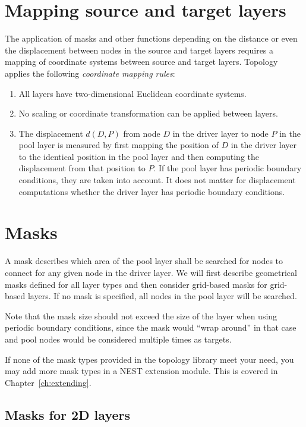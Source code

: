 \documentclass[a4paper,12pt]{report}
\begin{document}
\section{Mapping source and target layers}\label{sec:mapping}

The application of masks and other functions depending on the distance
or even the displacement between nodes in the source and target layers
requires a mapping of coordinate
systems between source and target
layers. Topology applies the following \emph{coordinate mapping
  rules}:
\begin{enumerate}
\item All layers have two-dimensional Euclidean coordinate systems.
\item No scaling or coordinate transformation can be applied between
  layers.
\item The displacement $d(D,P)$ from node $D$ in the driver layer to node $P$
  in the pool layer is measured by first mapping the position of $D$
  in the driver layer to the identical position in the pool layer and
  then computing the displacement from that position to $P$. If the
  pool layer has periodic boundary conditions, they are taken into
  account. It does not matter for displacement computations whether
  the driver layer has periodic boundary conditions.
\end{enumerate}


\section{Masks}\label{sec:conn_masks}

A mask describes which area of the pool layer shall be searched for
nodes to connect for any given node in the driver layer. We will first
describe geometrical masks defined for all layer types and then
consider grid-based masks for grid-based layers. If no mask is
specified, all nodes in the pool layer will be searched.

Note that the mask size should not exceed the size of the layer when
using periodic boundary conditions, since the mask would ``wrap
around'' in that case and pool nodes would be considered multiple
times as targets.

If none of the mask types provided in the topology library meet your need,
you may add more mask types in a NEST extension module. This is covered in
Chapter~\ref{ch:extending}.


\subsection{Masks for 2D layers}\label{sec:free_masks}
\end{document}
